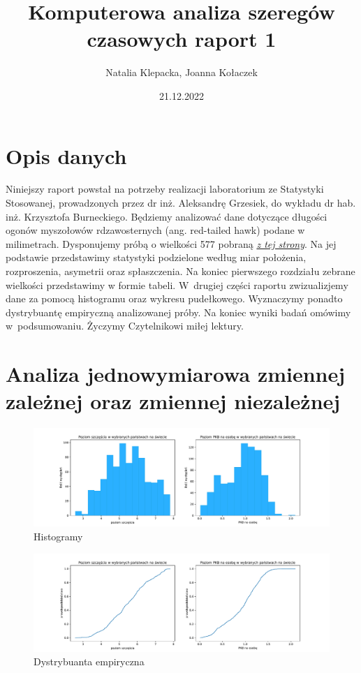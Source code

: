 \documentclass{article}
\title{Komputerowa analiza szeregów czasowych raport 1}
\author{Natalia Klepacka, Joanna Kołaczek}
\date{21.12.2022}
\theoremstyle{break}
\begin{document}
	\maketitle
	\tableofcontents
	\clearpage
\section{Opis danych}
	Niniejszy raport powstał na potrzeby realizacji laboratorium ze Statystyki Stosowanej, prowadzonych przez dr inż. Aleksandrę Grzesiek, do wykładu dr hab. inż. Krzysztofa Burneckiego. Będziemy analizować dane dotyczące długości ogonów myszołowów rdzawosternych (ang. red-tailed hawk) podane w milimetrach. Dysponujemy próbą o wielkości 577 pobraną \href{ https://vincentarelbundock.github.io/Rdatasets/datasets.html}{\textit{z tej strony}}. Na jej podstawie przedstawimy statystyki podzielone według miar położenia, rozproszenia, asymetrii oraz spłaszczenia. Na koniec pierwszego rozdziału zebrane wielkości przedstawimy w formie tabeli.  W~drugiej części raportu zwizualizjemy dane za pomocą histogramu oraz wykresu pudełkowego. Wyznaczymy ponadto dystrybuantę empiryczną analizowanej próby. Na koniec wyniki badań omówimy w~podsumowaniu. Życzymy Czytelnikowi miłej lektury.
	
\section{Analiza jednowymiarowa zmiennej zależnej oraz zmiennej niezależnej}

\begin{figure}[H]
	\begin{center}
		\includegraphics[scale=0.43]{hist.pdf}
		\caption{Histogramy}
		\label{fig:hist}
	\end{center}
\end{figure}

\begin{figure}[H]
	\begin{center}
		\includegraphics[scale=0.43]{distr.pdf}
		\caption{Dystrybuanta empiryczna}
		\label{fig:distr}
	\end{center}
\end{figure}
\end{document}

